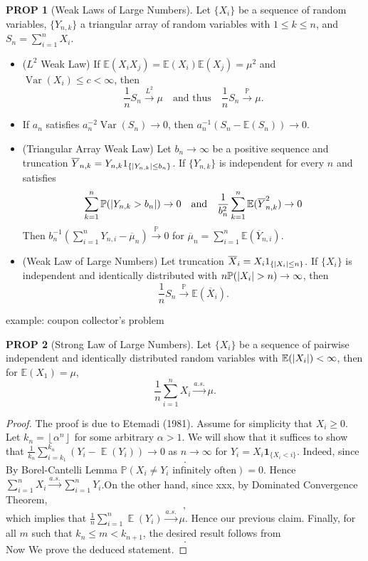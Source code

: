\documentclass[hidelinks,11pt]{article}
\theoremstyle{definition}
\theoremstyle{dotles}
\theoremstyle{dotless}
\newtheorem{prop}{PROP}[section]
\theoremstyle{remark}
\DeclareMathOperator{\Var}{Var}
\DeclareMathOperator{\E}{\mathbb{E}}
\begin{document}
\begin{prop}[Weak Laws of Large Numbers]
Let $\{X_i\}$ be a sequence of random variables, $\{Y_{n,k}\}$ a triangular array of random variables with $1\leq k\leq n$, and $S_n=\sum_{i=1}^nX_i$.
\begin{itemize}
    \item \textup{($L^2$ Weak Law)} If $\mathbb{E}(X_iX_j)=\mathbb{E}(X_i)\mathbb{E}(X_j)=\mu^2$ and $\Var(X_i)\leq c<\infty$, then
    \[\frac{1}{n}S_n\xrightarrow{L^2}\mu\quad\textrm{and thus}\quad\frac{1}{n}S_n\xrightarrow{\mathbb{P}}\mu.\]
    \item If $a_n$ satisfies $a_n^{-2}\Var(S_n)\to0$, then $a_n^{-1}(S_n-\mathbb{E}(S_n))\to0$.
    \item \textup{(Triangular Array Weak Law)} Let $b_n\to\infty$ be a positive sequence and truncation $\overline{Y}_{n,k}=Y_{n,k}1_{\{\abs{Y_{n,k}}\leq b_n\}}$. If $\{Y_{n,k}\}$ is independent for every $n$ and satisfies
    \[\sum_{k=1}^n\mathbb{P}(\abs{Y_{n,k}>b_n})\to0\quad\textrm{and}\quad\frac{1}{b_n^2}\sum_{k=1}^n\mathbb{E}(\overline{Y}_{n,k}^2)\to0\]
    Then $b_n^{-1}(\sum_{i=1}^nY_{n,i}-\overline{\mu}_n)\xrightarrow{\mathbb{P}}0$ for $\overline{\mu}_n=\sum_{i=1}^n\mathbb{E}(\overline{Y}_{n,i})$.
    \item \textup{(Weak Law of Large Numbers)} Let truncation $\overline{X}_i=X_i1_{\{\abs{X_i}\leq n\}}$. If $\{X_i\}$ is independent and identically distributed with $n\mathbb{P}(\abs{X_i}>n)\to\infty$, then
    \[\frac{1}{n}S_n\xrightarrow{\mathbb{P}}\mathbb{E}(\overline{X}_i).\]
\end{itemize}
\end{prop}

example: coupon collector's problem

\begin{prop}[Strong Law of Large Numbers]
Let $\{X_i\}$ be a sequence of pairwise independent and identically distributed random variables with $\mathbb{E}(\abs{X_i})<\infty$, then for $\mathbb{E}(X_1)=\mu$,
\[\frac{1}{n}\sum_{i=1}^nX_i\xrightarrow{a.s.}\mu.\]
\end{prop}
\begin{proof}
The proof is due to Etemadi (1981). Assume for simplicity that $X_i\geq0$. Let $k_n=\left\lfloor{\alpha^n}\right\rfloor$ for some arbitrary $\alpha>1$. We will show that it suffices to show that $\frac{1}{k_n}\sum_{i=k_1}^{k_n}(Y_i-\E(Y_i))\to0$ as $n\to\infty$ for $Y_i=X_i\textbf{1}_{\{X_i<i\}}$.\smallbreak
Indeed, since
\[.\]
By Borel-Cantelli Lemma $\mathbb{P}(X_i\neq Y_i\textrm{ infinitely often})=0$. Hence $\sum_{i=1}^nX_i\xrightarrow{a.s.}\sum_{i=1}^nY_i$.On the other hand, since xxx, by Dominated Convergence Theorem,
\[,\]
which implies that $\frac{1}{n}\sum_{i=1}^n\E(Y_i)\xrightarrow{a.s.}\mu$. Hence our previous claim. Finally, for all $m$ such that $k_n\leq m<k_{n+1}$, the desired result follows from
\[.\]
Now We prove the deduced statement.
\end{proof}
\end{document}
